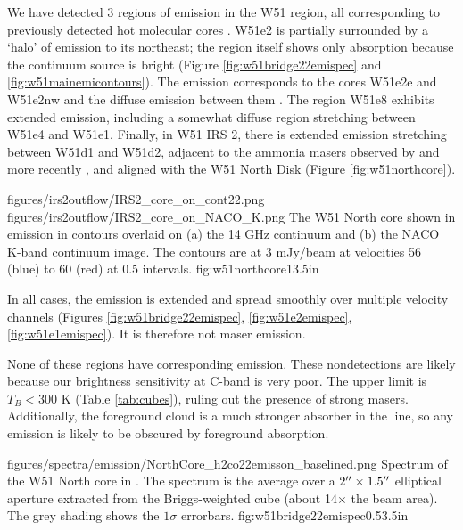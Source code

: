 We have detected 3 regions of \twotwo emission in the W51 region, all
corresponding to previously detected hot molecular cores
\citep{Zhang1997a,Shi2010a,Shi2010b,Goddi2015a}.   W51e2 is partially
surrounded by a `halo' of \formaldehyde \twotwo emission to its northeast; the
\hchii region itself shows only \twotwo
absorption because the continuum source is bright
(Figure \ref{fig:w51bridge22emispec} and \ref{fig:w51mainemicontours}).
The emission corresponds to the cores W51e2e and W51e2nw and the diffuse
emission between them \citep{Goddi2015b,Shi2010a}.
The \hchii region W51e8 exhibits extended \twotwo emission, including a
somewhat diffuse region stretching between W51e4 and W51e1.  Finally, in W51
IRS 2, there is extended \twotwo
emission stretching between W51d1 and W51d2, adjacent to the ammonia masers
observed by \citet{Zhang1995a} and more recently \citet{Goddi2015a}, and
aligned with the \citet{Zapata2010a} W51 North Disk (Figure
\ref{fig:w51northcore}).

\FigureTwo
{figures/irs2outflow/IRS2_core_on_cont22.png}
{figures/irs2outflow/IRS2_core_on_NACO_K.png}
{The W51 North core shown in \formaldehyde \twotwo emission in contours
overlaid on (a) the 14 GHz continuum and (b) the NACO K-band continuum image.
The contours are at 3 mJy/beam at velocities 56 (blue) to 60 (red) \kms at 0.5
\kms intervals.
}
{fig:w51northcore}{1}{3.5in}

In all cases, the emission is extended and spread smoothly over multiple
velocity channels (Figures 
\ref{fig:w51bridge22emispec}, \ref{fig:w51e2emispec}, \ref{fig:w51e1emispec}).
It is therefore not maser emission.

None of these regions have corresponding \oneone emission.  These
nondetections are likely because our brightness sensitivity at C-band is very
poor.  The upper limit is $T_B<300$ K (Table \ref{tab:cubes}), ruling out the presence
of strong
masers.  Additionally, the foreground cloud is a much stronger absorber in the
\oneone line, so any emission is likely to be obscured by foreground
absorption.


\Figure
{{figures/spectra/emission/NorthCore_h2co22emisson_baselined}.png}
{Spectrum of the W51 North core in \ortho \twotwo.  The spectrum
is the average over a $2\mbox{$^{\prime\prime}$}\times1.5\mbox{$^{\prime\prime}$}$ elliptical aperture extracted
from the Briggs-weighted cube (about 14$\times$ the beam area).  The grey
shading shows the $1\sigma$
errorbars.
}
{fig:w51bridge22emispec}{0.5}{3.5in}

